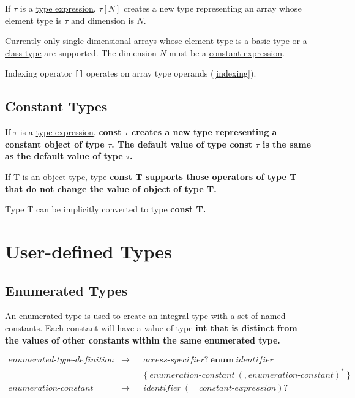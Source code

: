 \documentclass[a4paper,oneside,11pt]{article}
\begin{document}
If $\tau$ is a \hyperref[typeexpr]{type expression}, $\tau[N]$ creates a new type representing an array whose element type is $\tau$ and dimension is $N$.

Currently only single-dimensional arrays whose element type is a \hyperref[basictype]{basic type} or
a \hyperref[sec:classtypes]{class type} are supported.
The dimension $N$ must be a \hyperref[constantexpr]{constant expression}.

Indexing operator \texttt{[]} operates on array type operands (\ref{indexing}).

\subsection{Constant Types}

If $\tau$ is a \hyperref[typeexpr]{type expression}, \bf{const} $\tau$ creates a new type representing a constant object of type $\tau$.
The default value of type \bf{const} $\tau$ is the same as the default value of type $\tau$.

If T is an object type, type \bf{const} T supports those operators of type T that do not change the value of object of type T.

Type T can be implicitly converted to type \bf{const} T.

\section{User-defined Types}

\subsection{Enumerated Types}\label{sec:enumerations}\label{enumeratedtypedefinition}

An enumerated type is used to create an integral type with a set of named constants.
Each constant will have a value of type \bf{int} that is distinct
from the values of other constants within the same enumerated type.

\begin{align*}
enumerated\textrm{-}type\textrm{-}definition &\rightarrow & &\hyperref[accessspecifier]{access\textrm{-}specifier}? \> \textbf{enum} \>
\hyperref[identifier]{identifier}\\
& & &\texttt{\{} \> enumeration\textrm{-}constant \> (\texttt{,} \> enumeration\textrm{-}constant)^* \> \texttt{\}}\\
enumeration\textrm{-}constant &\rightarrow & &\hyperref[identifier]{identifier} \> (\texttt{=} \> \hyperref[constantexpr]{constant\textrm{-}expression})?
\end{align*}
\end{document}

